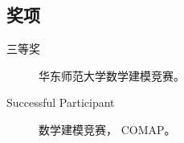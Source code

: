 \documentclass[margin]{res}
\begin{document}
\begin{resume}
		
		
		
		\section{奖项}
		\begin{description}
		  \item[三等奖] 华东师范大学数学建模竞赛。
		  \item[Successful Participant] 数学建模竞赛， COMAP。
		\end{description} 
		
% 		
		
		
	\end{resume}
\end{document}
